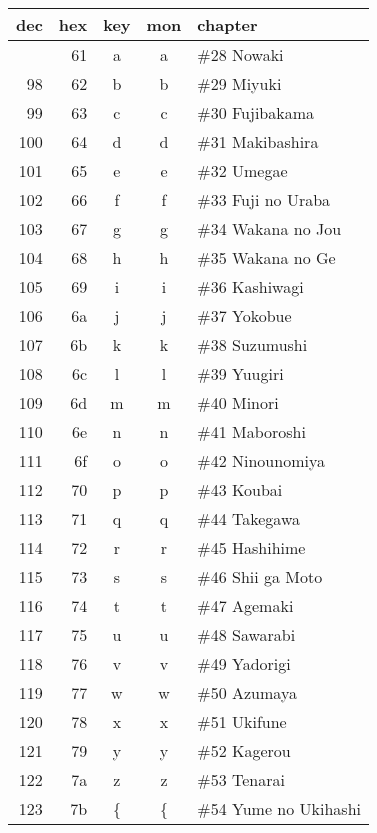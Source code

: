 \documentclass[12pt]{article}
\newcommand\genji[1]{{\genjiface #1}}
\begin{document}
\begin{tabular}{rrccl}
 dec & hex & key & mon & chapter \\ \hline \bigstrut[t]
  97 & 61 & a & \genji{\large a} & \#28 Nowaki \\
  98 & 62 & b & \genji{\large b} & \#29 Miyuki \\
  99 & 63 & c & \genji{\large c} & \#30 Fujibakama \\
  100 & 64 & d & \genji{\large d} & \#31 Makibashira \\
  101 & 65 & e & \genji{\large e} & \#32 Umegae \\
  102 & 66 & f & \genji{\large f} & \#33 Fuji no Uraba \\
  103 & 67 & g & \genji{\large g} & \#34 Wakana no Jou \\
  104 & 68 & h & \genji{\large h} & \#35 Wakana no Ge \\
  105 & 69 & i & \genji{\large i} & \#36 Kashiwagi \\
  106 & 6a & j & \genji{\large j} & \#37 Yokobue \\
  107 & 6b & k & \genji{\large k} & \#38 Suzumushi \\
  108 & 6c & l & \genji{\large l} & \#39 Yuugiri \\
  109 & 6d & m & \genji{\large m} & \#40 Minori \\
  110 & 6e & n & \genji{\large n} & \#41 Maboroshi \\
  111 & 6f & o & \genji{\large o} & \#42 Ninounomiya \\
  112 & 70 & p & \genji{\large p} & \#43 Koubai \\
  113 & 71 & q & \genji{\large q} & \#44 Takegawa \\
  114 & 72 & r & \genji{\large r} & \#45 Hashihime \\
  115 & 73 & s & \genji{\large s} & \#46 Shii ga Moto \\
  116 & 74 & t & \genji{\large t} & \#47 Agemaki \\
  117 & 75 & u & \genji{\large u} & \#48 Sawarabi \\
  118 & 76 & v & \genji{\large v} & \#49 Yadorigi \\
  119 & 77 & w & \genji{\large w} & \#50 Azumaya \\
  120 & 78 & x & \genji{\large x} & \#51 Ukifune \\
  121 & 79 & y & \genji{\large y} & \#52 Kagerou \\
  122 & 7a & z & \genji{\large z} & \#53 Tenarai \\
  123 & 7b & \{ & \genji{\large \{} & \#54 Yume no Ukihashi
\end{tabular}
\end{document}
